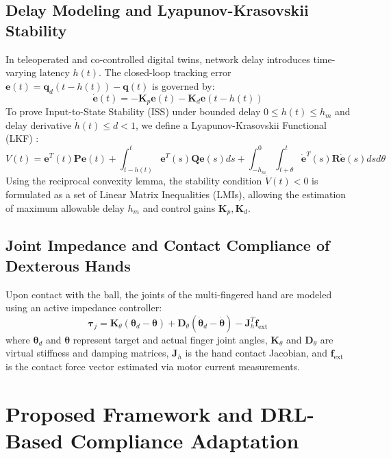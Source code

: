 \documentclass[letterpaper,journal]{IEEEtran}
\begin{document}
\subsection{Delay Modeling and Lyapunov-Krasovskii Stability}
In teleoperated and co-controlled digital twins, network delay introduces time-varying latency $h(t)$. The closed-loop tracking error $\mathbf{e}(t) = \mathbf{q}_d(t - h(t)) - \mathbf{q}(t)$ is governed by:
\begin{equation}
\dot{\mathbf{e}}(t) = -\mathbf{K}_p \mathbf{e}(t) - \mathbf{K}_d \mathbf{e}(t - h(t))
\end{equation}
To prove Input-to-State Stability (ISS) under bounded delay $0 \le h(t) \le h_m$ and delay derivative $\dot{h}(t) \le d < 1$, we define a Lyapunov-Krasovskii Functional (LKF) \cite{haptic_delay_lkf}:
\begin{equation}
V(t) = \mathbf{e}^T(t) \mathbf{P} \mathbf{e}(t) + \int_{t-h(t)}^{t} \mathbf{e}^T(s) \mathbf{Q} \mathbf{e}(s) ds + \int_{-h_m}^{0} \int_{t+\theta}^{t} \dot{\mathbf{e}}^T(s) \mathbf{R} \dot{\mathbf{e}}(s) ds d\theta
\end{equation}
Using the reciprocal convexity lemma, the stability condition $\dot{V}(t) < 0$ is formulated as a set of Linear Matrix Inequalities (LMIs), allowing the estimation of maximum allowable delay $h_m$ and control gains $\mathbf{K}_p, \mathbf{K}_d$.

\subsection{Joint Impedance and Contact Compliance of Dexterous Hands}
Upon contact with the ball, the joints of the multi-fingered hand are modeled using an active impedance controller:
\begin{equation}
\boldsymbol{\tau}_j = \mathbf{K}_{\theta} (\boldsymbol{\theta}_d - \boldsymbol{\theta}) + \mathbf{D}_{\theta} (\dot{\boldsymbol{\theta}}_d - \dot{\boldsymbol{\theta}}) - \mathbf{J}_h^T \mathbf{f}_{\text{ext}}
\end{equation}
where $\boldsymbol{\theta}_d$ and $\boldsymbol{\theta}$ represent target and actual finger joint angles, $\mathbf{K}_{\theta}$ and $\mathbf{D}_{\theta}$ are virtual stiffness and damping matrices, $\mathbf{J}_h$ is the hand contact Jacobian, and $\mathbf{f}_{\text{ext}}$ is the contact force vector estimated via motor current measurements.

\section{Proposed Framework and DRL-Based Compliance Adaptation}
\end{document}
